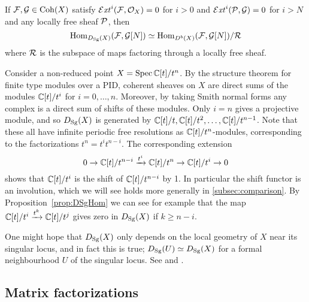\begin{proposition}[label=prop:DSgHom]{\cite[Prop 1.21]{OrlovSingularities}}{}
    If $\mathcal{F},\mathcal{G}\in\operatorname{Coh}(X)$ satisfy
    $\operatorname{\mathcal{E}\mathit{xt}}^i(\mathcal{F},\mathcal{O}_X)=0$ for $i>0$ and $\operatorname{\mathcal{E}\mathit{xt}}^i(\mathcal{P},\mathcal{G})=0$ for $i>N$ and
    any locally free sheaf $\mathcal{P}$, then
    \begin{equation*}
        \operatorname{Hom}_{D_{\mathrm{Sg}}(X)}(\mathcal{F},\mathcal{G}[N])
            \simeq \operatorname{Hom}_{D^b(X)}(\mathcal{F},\mathcal{G}[N])/\mathcal{R}
    \end{equation*}
    where $\mathcal{R}$ is the subspace of maps factoring through a locally free
    sheaf.
\end{proposition}

\begin{example}[label=ex:nonreducedpoint]{}{}
    Consider a non-reduced point $X=\operatorname{Spec}\mathbb{C}[t]/t^n$. By the structure theorem
    for finite type modules over a PID, coherent sheaves on $X$ are direct sums
    of the modules $\mathbb{C}[t]/t^i$ for $i=0,\ldots,n$. Moreover, by taking Smith
    normal forms any complex is a direct sum of shifts of these modules. Only
    $i=n$ gives a projective module, and so $D_{\mathrm{Sg}}(X)$ is generated by
    $\mathbb{C}[t]/t,\mathbb{C}[t]/t^2,\ldots,\mathbb{C}[t]/t^{n-1}$. Note that these all have infinite
    periodic free resolutions as $\mathbb{C}[t]/t^n$-modules, corresponding to the
    factorizations $t^n=t^it^{n-i}$. The corresponding extension
    \begin{equation*}
        0 \to \mathbb{C}[t]/t^{n-i} \xrightarrow{t^i} \mathbb{C}[t]/t^n \to \mathbb{C}[t]/t^i \to 0
    \end{equation*}
    shows that $\mathbb{C}[t]/t^i$ is the shift of $\mathbb{C}[t]/t^{n-i}$ by 1. In particular
    the shift functor is an involution, which we will see holds more generally
    in \ref{subsec:comparison}. By Proposition~\ref{prop:DSgHom} we can see for
    example that the map $\mathbb{C}[t]/t^i\xrightarrow{t^k}\mathbb{C}[t]/t^j$ gives zero in
    $D_{\mathrm{Sg}}(X)$ if $k\ge n-i$.
\end{example}

One might hope that $D_{\mathrm{Sg}}(X)$ only depends on the local geometry of $X$ near
its singular locus, and in fact this is true; $D_{\mathrm{Sg}}(U)\simeq D_{\mathrm{Sg}}(X)$ for a
formal neighbourhood $U$ of the singular locus. See
\cite[Prop~1.14]{OrlovSingularities} and \cite[\S6]{Shipman}.

\subsection{Matrix factorizations}

